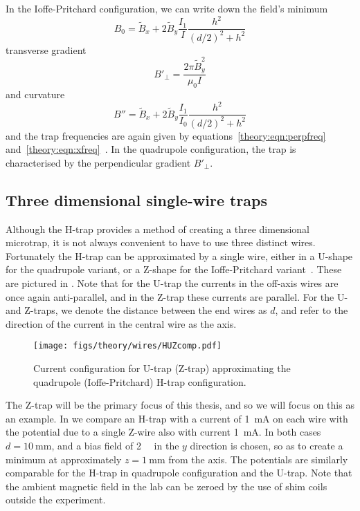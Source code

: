 In the Ioffe-Pritchard configuration, we can write down the field's
minimum
%
\begin{equation}
  B_0 = \tilde{B}_x + 2\tilde{B}_y \frac{I_1}{I}\frac{h^2}{(d/2)^2 + h^2}
\end{equation}
%
transverse gradient
%
\begin{equation}
  B'_\perp = \frac{2\pi\tilde{B}_y^2}{\mu_0 I}
\end{equation}
%
and curvature~\cite{PhysRevA.79.013407}
%
\begin{equation}
  B'' = \tilde{B}_x + 2\tilde{B}_y\frac{I_1}{I_0}\frac{h^2}{(d/2)^2+h^2}
\end{equation}
%
and the trap frequencies are again given by equations~\ref{theory:eqn:perpfreq}
and~\ref{theory:eqn:xfreq}~\cite{PhysRevA.79.013407}. In the quadrupole
configuration, the trap is characterised by the perpendicular gradient
$B'_\perp$. 

\subsection{Three dimensional single-wire traps}

Although the H-trap provides a method of creating a three dimensional
microtrap, it is not always convenient to have to use three distinct wires.
Fortunately the H-trap can be approximated by a single wire, either in a
U-shape for the quadrupole variant, or a Z-shape for the Ioffe-Pritchard
variant~\cite{2011Ac}. These are pictured in . Note
that for the U-trap the currents in the off-axis wires are once again
anti-parallel, and in the Z-trap these currents are parallel. For the U- and
Z-traps, we denote the distance between the end wires as $d$, and refer
to the direction of the current in the central wire as the axis.

\begin{figure}[htbp]
  \centering
  \texttt{[image: figs/theory/wires/HUZcomp.pdf]}
  \caption[U- and Z-traps]{Current configuration for U-trap (Z-trap)
  approximating the quadrupole (Ioffe-Pritchard) H-trap configuration.}
  \label{theory:fig:HUZ}
\end{figure}

The Z-trap will be the primary focus of this thesis, and so we will focus on
this as an example. In  we compare an H-trap
with a current of \SI{1}{\milli\ampere} on each wire with the potential due to
a single Z-wire also with current \SI{1}{\milli\ampere}. In both cases
$d=\SI{10}{\milli\meter}$, and a bias field of \SI{2}{\milli\gauss} in the $y$
direction is chosen, so as to create a minimum at approximately
$z=\SI{1}{\milli\meter}$ from the axis. The potentials are similarly
comparable for the H-trap in quadrupole configuration and the U-trap. Note that
the ambient magnetic field in the lab can be zeroed by the use of shim coils
outside the experiment.

